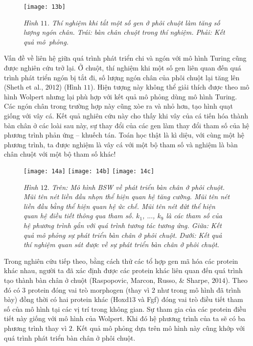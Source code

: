\begin{multicols}{2}
\begin{figure}[H]
		\texttt{[image: 13b]}
		\caption{\small\textit{\color{timhieukhoahoc}Hình $11$. Thí nghiệm khi tắt một số gen ở phôi chuột làm tăng số lượng ngón chân. Trái: bàn chân chuột trong thí nghiệm. Phải: Kết quả mô~phỏng.}}
		\vspace*{-10pt}
	\end{figure}
	Vấn đề về liên hệ giữa quá trình phát triển chi và ngón với mô hình Turing cũng được nghiên cứu trở lại. Ở chuột, thí nghiệm khi một số gen liên quan đến quá trình phát triển ngón bị tắt đi, số lượng ngón chân của phôi chuột lại tăng lên (Sheth et al., $2012$) (Hình $11$). Hiện tượng này không  thể giải thích được theo mô hình Wolpert nhưng lại phù hợp với kết quả mô phỏng dùng mô hình Turing. Các ngón chân trong trường hợp này cũng xòe ra và nhỏ hơn, tạo hình quạt giống với vây cá. Kết quả nghiên cứu này cho thấy khi vây của cá tiến hóa thành bàn chân ở các loài sau này, sự thay đổi của các gen làm thay đổi tham số của hệ phương trình phản ứng -- khuếch tán. Toán học thật là kì diệu, với cùng một hệ phương trình, ta được nghiệm là vây cá với một bộ tham số và nghiệm là bàn chân chuột với một bộ tham số khác!
	\begin{figure}[H]
		\vspace*{-5pt}
		\centering
		\captionsetup{labelformat= empty, justification=centering}
		\texttt{[image: 14a]}
		\texttt{[image: 14b]}
		\texttt{[image: 14c]}
		\caption{\small\textit{\color{timhieukhoahoc}Hình $12.$ Trên: Mô hình BSW về phát triển bàn chân ở phôi chuột. Mũi tên nét liền đầu nhọn thể hiện quan hệ tăng cường. Mũi tên nét liền đầu bằng thể hiện quan hệ ức chế. Mũi tên nét đứt thể hiện quan hệ điều tiết thông qua tham số. $k_1$, $...$, $k_9$ là các tham số của hệ phương trình gắn với quá trình tương tác tương ứng. Giữa: Kết quả mô phỏng sự phát triển bàn chân ở phôi chuột. Dưới: Kết quả thí nghiệm quan sát được về sự phát triển bàn chân ở phôi chuột.}}
		\vspace*{-10pt}
	\end{figure}
	Trong nghiên cứu tiếp theo, bằng cách thử các tổ hợp gen mã hóa các protein khác nhau, người ta đã xác định được các protein khác liên quan đến quá trình tạo thành bàn chân ở chuột (Raspopovic, Marcon, Russo, \& Sharpe, $2014$). Theo đó có $3$ protein đóng vai trò morphogen (thay vì $2$ như trong mô hình đã trình bày) đồng thời có hai protein khác (Hoxd$13$ và Fgf) đóng vai trò điều tiết tham số của mô hình tại các vị trí trong không gian. Sự tham gia của các protein điều tiết này giống với mô hình của Wolpert. Khi đó hệ phương trình của ta sẽ có ba phương trình thay vì $2$. Kết quả mô phỏng dựa trên mô hình này cũng khớp với quá trình phát triển bàn chân ở phôi chuột.

\end{multicols}
